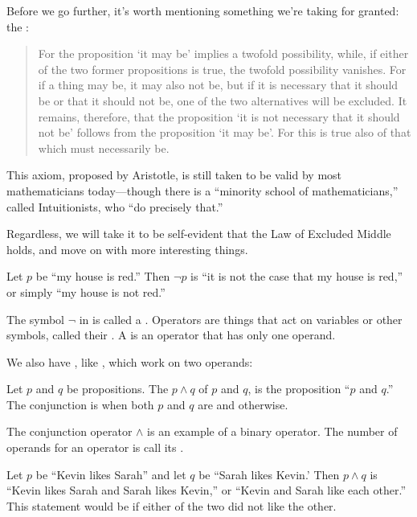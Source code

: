\newcommand{\lawofmiddle}{Law of Excluded Middle}
Before we go further, it's worth mentioning something we're taking for granted:
the \axiomintro{\lawofmiddle{}}:
\begin{quote}
  For the proposition `it may be' implies a twofold possibility, while, if either of the two former propositions is true, the twofold possibility vanishes. For if a thing may be, it may also not be, but if it is necessary that it should be or that it should not be, one of the two alternatives will be excluded. It remains, therefore, that the proposition `it is not necessary that it should not be' follows from the proposition `it may be'. For this is true also of that which must necessarily be.\cite{aris-interp}
\end{quote}
This axiom, proposed by Aristotle, is still taken to be valid by most mathematicians today---though there is a ``minority school of mathematicians,'' called Intuitionists, who ``do precisely that.''\cite{trudeau}

Regardless, we will take it to be self-evident that the \lawofmiddle{} holds, and move on with more interesting things.

\begin{ex}
  Let $p$ be ``my house is red.''
  Then $\neg p$ is
  ``it is not the case that my house is red,''
  or simply
  ``my house is not red.''
\end{ex}

The symbol $\neg$ in  is called a . Operators are things that act on variables or other symbols, called their . A  is an operator that has only one operand.

We also have , like , which work on two operands:
\begin{defn}[conjunction]
  Let $p$ and $q$ be propositions.
  The 
  $p \wedge q$
  of $p$ and $q$,
  is the proposition
  ``$p$ and $q$.''
  The conjunction is \ltrue{} when both $p$ and $q$ are \ltrue{} and \lfalse{} otherwise.
\end{defn}
The conjunction operator $\wedge$ is an example of a binary operator.
The number of operands for an operator is call its .
\begin{ex}
  Let $p$ be ``Kevin likes Sarah'' and let $q$ be ``Sarah likes Kevin.'
  Then $p \wedge q$ is
  ``Kevin likes Sarah and Sarah likes Kevin,''
  or ``Kevin and Sarah like each other.''
  This statement would be \lfalse{} if either of the two did not like the other.
\end{ex}


